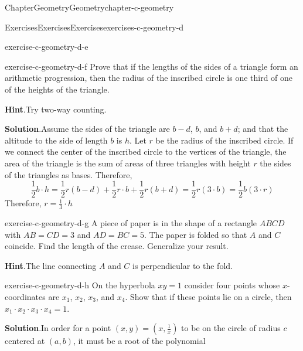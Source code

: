 \documentclass[oneside,10pt,]{book}
\newcommand{\blocktitlefont}{\relax}
\numberwithin{equation}{section}
\begin{document}
\begin{chapterptx}{Chapter}{Geometry}{}{Geometry}{}{}{chapter-c-geometry}
\begin{exercises-section}{Exercises}{Exercises}{}{Exercises}{}{}{exercises-c-geometry-d}
\begin{divisionexercise}{4}{}{}{exercise-c-geometry-d-e}
\begin{equation*}
\end{equation*}
%
\end{divisionexercise}%
\begin{divisionexercise}{5}{}{}{exercise-c-geometry-d-f}%
Prove that if the lengths of the sides of a triangle form an arithmetic progression, then the radius of the inscribed circle is one third of one of the heights of the triangle.%
\par\smallskip%
\noindent\textbf{\blocktitlefont Hint}.\hypertarget{hint-c-geometry-d-f-b}{}\quad{}Try two-way counting.%
\par\smallskip%
\noindent\textbf{\blocktitlefont Solution}.\hypertarget{solution-c-geometry-d-f-c}{}\quad{}Assume the sides of the triangle are \(b-d\), \(b\), and \(b+d\); and that the altitude to the side of length \(b\) is \(h\). Let \(r\) be the radius of the inscribed circle.  If we connect the center of the inscribed circle to the vertices of the triangle, the area of the triangle is the sum of areas of three triangles with height \(r\) the sides of the triangles as bases.  Therefore,%
\begin{equation*}
\frac{1}{2} b \cdot h = \frac{1}{2} r(b-d)+ \frac{1}{2} r\cdot b+ \frac{1}{2} r(b+d) = \frac{1}{2}r(3\cdot b) = \frac{1}{2}b(3\cdot r)
\end{equation*}
Therefore, \(r=\frac{1}{3}\cdot h\)%
\end{divisionexercise}%
\begin{divisionexercise}{6}{}{}{exercise-c-geometry-d-g}%
A piece of paper is in the shape of a rectangle \(ABCD\) with \(AB=CD=3\) and \(AD=BC=5\). The paper is folded so that \(A\) and \(C\) coincide. Find the length of the crease.  Generalize your result.%
\par\smallskip%
\noindent\textbf{\blocktitlefont Hint}.\hypertarget{hint-c-geometry-d-g-b}{}\quad{}The line connecting \(A\) and \(C\) is perpendicular to the fold.%
\end{divisionexercise}%
\begin{divisionexercise}{7}{}{}{exercise-c-geometry-d-h}%
On the hyperbola \(x y = 1\) consider four points whose \(x\)-coordinates are \(x_1\), \(x_2\), \(x_3\), and \(x_4\). Show that if these points lie on a circle, then \(x_1 \cdot  x_{2} \cdot x_{3}\cdot x_4 = 1\).%
\par\smallskip%
\noindent\textbf{\blocktitlefont Solution}.\hypertarget{solution-c-geometry-d-h-b}{}\quad{}In order for a point \((x,y) =(x,\frac{1}{x})\) to be on the circle of radius \(c\) centered at \((a,b)\), it must be a root of the polynomial%

\end{divisionexercise}
\end{exercises-section}
\end{chapterptx}
\end{document}
